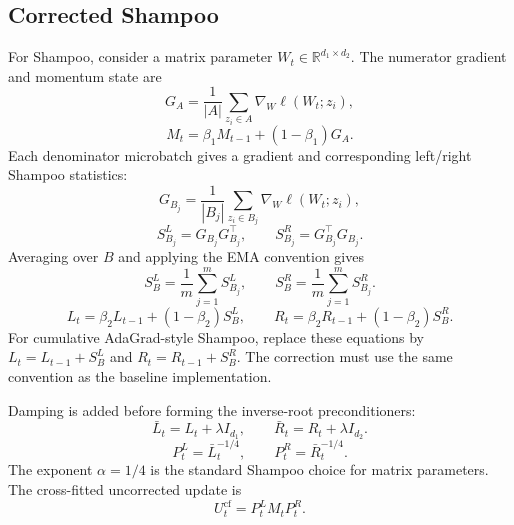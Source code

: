 \documentclass{article}
\begin{document}
\subsection{Corrected Shampoo}
\label{app:shampoo-implementation}

For Shampoo, consider a matrix parameter $W_t\in\mathbb{R}^{d_1\times d_2}$. The numerator gradient and momentum state are
\begin{equation}
    G_A
    =
    \frac{1}{|A|}\sum_{z_i\in A}\nabla_W\ell(W_t;z_i),
\end{equation}
\begin{equation}
    M_t
    =
    \beta_1M_{t-1}+(1-\beta_1)G_A.
\end{equation}
Each denominator microbatch gives a gradient and corresponding left/right Shampoo statistics:
\begin{equation}
    G_{B_j}
    =
    \frac{1}{|B_j|}\sum_{z_i\in B_j}\nabla_W\ell(W_t;z_i),
\end{equation}
\begin{equation}
    S^L_{B_j}=G_{B_j}G_{B_j}^{\top},
    \qquad
    S^R_{B_j}=G_{B_j}^{\top}G_{B_j}.
\end{equation}
Averaging over $B$ and applying the EMA convention gives
\begin{equation}
    S_B^L=\frac{1}{m}\sum_{j=1}^m S^L_{B_j},
    \qquad
    S_B^R=\frac{1}{m}\sum_{j=1}^m S^R_{B_j}.
\end{equation}
\begin{equation}
    L_t=\beta_2L_{t-1}+(1-\beta_2)S_B^L,
    \qquad
    R_t=\beta_2R_{t-1}+(1-\beta_2)S_B^R.
\end{equation}
For cumulative AdaGrad-style Shampoo, replace these equations by $L_t=L_{t-1}+S_B^L$ and $R_t=R_{t-1}+S_B^R$. The correction must use the same convention as the baseline implementation.

Damping is added before forming the inverse-root preconditioners:
\begin{equation}
    \bar L_t=L_t+\lambda I_{d_1},
    \qquad
    \bar R_t=R_t+\lambda I_{d_2}.
\end{equation}
\begin{equation}
    P_t^L=\bar L_t^{-1/4},
    \qquad
    P_t^R=\bar R_t^{-1/4}.
\end{equation}
The exponent $\alpha=1/4$ is the standard Shampoo choice for matrix parameters. The cross-fitted uncorrected update is
\begin{equation}
    U_t^{\mathrm{cf}}
    =
    P_t^L M_t P_t^R.
\end{equation}
\end{document}
